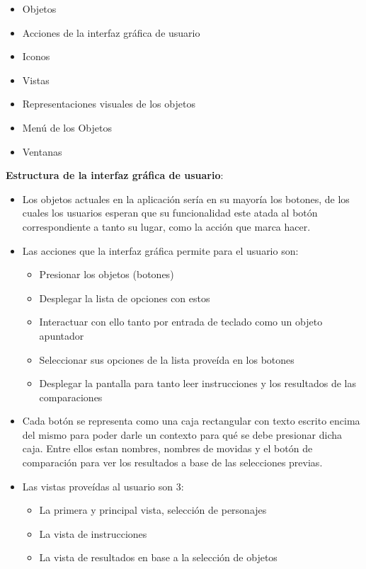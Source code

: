 \begin{itemize}
    \item Objetos
    \item Acciones de la interfaz gráfica de usuario
    \item Iconos
    \item Vistas
    \item Representaciones visuales de los objetos
    \item Menú de los Objetos
    \item Ventanas
\end{itemize}

\textbf{Estructura de la interfaz gráfica de usuario}:

\begin{itemize}
    \item Los objetos actuales en la aplicación sería en su mayoría los botones, de los cuales los usuarios esperan que su funcionalidad este atada al botón correspondiente a tanto su lugar, como la acción que marca hacer.
    \item Las acciones que la interfaz gráfica permite para el usuario son:
    \begin{itemize}
        \item Presionar los objetos (botones)
        \item Desplegar la lista de opciones con estos
        \item Interactuar con ello tanto por entrada de teclado como un objeto apuntador
        \item Seleccionar sus opciones de la lista proveída en los botones
        \item Desplegar la pantalla para tanto leer instrucciones y los resultados de las comparaciones
    \end{itemize}
    \item Cada botón se representa como una caja rectangular con texto escrito encima del mismo para poder darle un contexto para qué se debe presionar dicha caja. Entre ellos estan nombres, nombres de movidas y el botón de comparación para ver los resultados a base de las selecciones previas.
    \item Las vistas proveídas al usuario son 3:
    \begin{itemize}
        \item La primera y principal vista, selección de personajes
        \item La vista de instrucciones
        \item La vista de resultados en base a la selección de objetos

\end{itemize}
\end{itemize}
